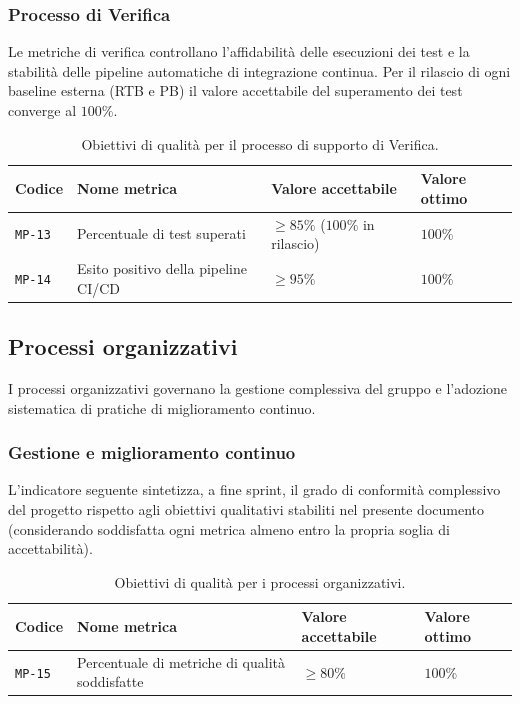 \documentclass[11pt, a4paper]{article}
\newcommand{\req}[1]{\texttt{#1}}
\begin{document}
\subsubsection{Processo di Verifica}
Le metriche di verifica controllano l'affidabilità delle esecuzioni dei test e la stabilità delle pipeline automatiche di integrazione continua. Per il rilascio di ogni baseline esterna (RTB e PB) il valore accettabile del superamento dei test converge al $100\%$.

\begin{table}[htbp]
    \centering
    \renewcommand{\arraystretch}{1.3}
    \begin{tabularx}{\textwidth}{|P{1.8cm}|X|P{3.8cm}|P{3.4cm}|}
        \hline
        \textbf{\textcolor{primaryColor}{Codice}} & \textbf{\textcolor{primaryColor}{Nome metrica}} & \textbf{\textcolor{primaryColor}{Valore accettabile}} & \textbf{\textcolor{primaryColor}{Valore ottimo}} \\ \hline
        \req{MP-13} & Percentuale di test superati & $\ge 85\%$ ($100\%$ in rilascio) & $100\%$ \\ \hline
        \req{MP-14} & Esito positivo della pipeline CI/CD & $\ge 95\%$ & $100\%$ \\ \hline
    \end{tabularx}
    \caption{Obiettivi di qualità per il processo di supporto di Verifica.}
    \label{tab:proc-verifica}
\end{table}

\subsection{Processi organizzativi}
I processi organizzativi governano la gestione complessiva del gruppo e l'adozione sistematica di pratiche di miglioramento continuo.

\subsubsection{Gestione e miglioramento continuo}
L'indicatore seguente sintetizza, a fine sprint, il grado di conformità complessivo del progetto rispetto agli obiettivi qualitativi stabiliti nel presente documento (considerando soddisfatta ogni metrica almeno entro la propria soglia di accettabilità).

\begin{table}[htbp]
    \centering
    \renewcommand{\arraystretch}{1.3}
    \begin{tabularx}{\textwidth}{|P{1.8cm}|X|P{3.8cm}|P{3.4cm}|}
        \hline
        \textbf{\textcolor{primaryColor}{Codice}} & \textbf{\textcolor{primaryColor}{Nome metrica}} & \textbf{\textcolor{primaryColor}{Valore accettabile}} & \textbf{\textcolor{primaryColor}{Valore ottimo}} \\ \hline
        \req{MP-15} & Percentuale di metriche di qualità soddisfatte & $\ge 80\%$ & $100\%$ \\ \hline
    \end{tabularx}
    \caption{Obiettivi di qualità per i processi organizzativi.}
    \label{tab:proc-organizzativi}
\end{table}
\end{document}
